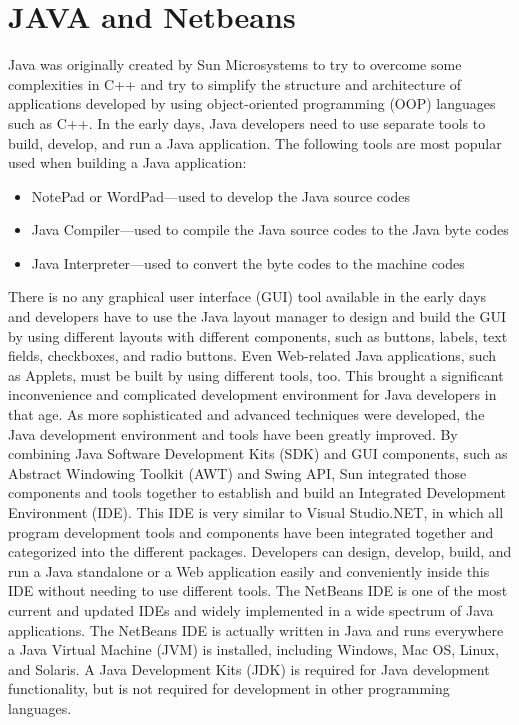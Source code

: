 \documentclass[12pt,a4paper,final,twoside,onecolumn,titlepage]{book}
\begin{document}
\section{JAVA and Netbeans}
Java was originally created by Sun Microsystems to try to overcome some complexities in C++ and try to simplify the structure and architecture of applications developed by using object-oriented programming (OOP) languages such as C++. In the early days, Java developers need to use separate tools to build, develop, and run a Java application. The following tools are most popular used when building a Java application:
\begin{itemize}
\item NotePad or WordPad—used to develop the Java source codes
\item Java Compiler—used to compile the Java source codes to the Java byte codes
\item Java Interpreter—used to convert the byte codes to the machine codes
\end{itemize}
There is no any graphical user interface (GUI) tool available in the early days and developers have to use the Java layout manager to design and build the GUI by using different layouts with different components, such as buttons, labels, text fields, checkboxes, and radio buttons. Even Web-related Java applications, such as Applets, must be built by using different tools, too. This brought a significant inconvenience and complicated development environment for Java developers in that age.
As more sophisticated and advanced techniques were developed, the Java development environment and tools have been greatly improved. By combining Java Software Development Kits (SDK) and GUI components, such as Abstract Windowing Toolkit (AWT) and Swing API, Sun integrated those components and tools together to establish and build an Integrated Development Environment (IDE). This IDE is very similar to Visual Studio.NET, in which all program development tools and components have been integrated together and categorized into the different packages. Developers can design, develop, build, and run a Java standalone or a Web application easily and conveniently inside this IDE without needing to use different tools.
The NetBeans IDE is one of the most current and updated IDEs and widely implemented in a wide spectrum of Java applications. The NetBeans IDE is actually written in Java and runs everywhere a Java Virtual Machine (JVM) is installed, including Windows, Mac OS, Linux, and Solaris. A Java Development Kits (JDK) is required for Java development functionality, but is not required for development in other programming languages.
\end{document}
